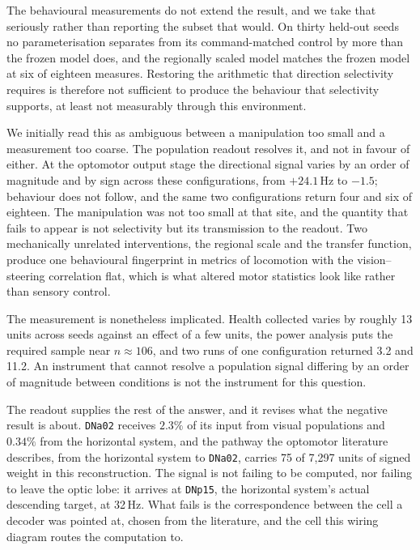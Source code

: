 \documentclass[10pt,twoside]{article}
\newcommand{\cell}[1]{\texttt{#1}}
\begin{document}
The behavioural measurements do not extend the result, and we take that
seriously rather than reporting the subset that would. On thirty held-out
seeds no parameterisation separates from its command-matched control by more
than the frozen model does, and the regionally scaled model matches the frozen
model at six of eighteen measures. Restoring the arithmetic that direction
selectivity requires is therefore not sufficient to produce the behaviour that
selectivity supports, at least not measurably through this environment.

We initially read this as ambiguous between a manipulation too small and a
measurement too coarse. The population readout resolves it, and not in favour
of either. At the optomotor output stage the directional signal varies by an
order of magnitude and by sign across these configurations, from $+24.1$\,Hz
to $-1.5$; behaviour does not follow, and the same two configurations return
four and six of eighteen. The manipulation was not too small at that site, and
the quantity that fails to appear is not selectivity but its transmission to
the readout. Two mechanically unrelated interventions, the regional scale and
the transfer function, produce one behavioural fingerprint in metrics of
locomotion with the vision--steering correlation flat, which is what altered
motor statistics look like rather than sensory control.

The measurement is nonetheless implicated. Health collected varies by roughly
13 units across seeds against an effect of a few units, the power analysis
puts the required sample near $n\approx106$, and two runs of one configuration
returned 3.2 and 11.2. An instrument that cannot resolve a population signal
differing by an order of magnitude between conditions is not the instrument
for this question.

The readout supplies the rest of the answer, and it revises what the negative
result is about. \cell{DNa02} receives $2.3\%$ of its input from visual
populations and $0.34\%$ from the horizontal system, and the pathway the
optomotor literature describes, from the horizontal system to \cell{DNa02},
carries 75 of 7{,}297 units of signed weight in this reconstruction. The
signal is not failing to be computed, nor failing to leave the optic lobe: it
arrives at \cell{DNp15}, the horizontal system's actual descending target, at
32\,Hz. What fails is the correspondence between the cell a decoder was
pointed at, chosen from the literature, and the cell this wiring diagram
routes the computation to.
\end{document}
